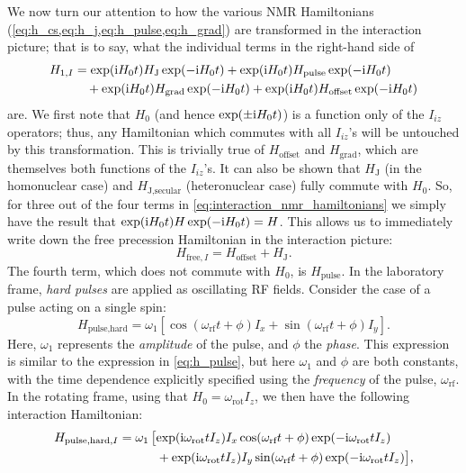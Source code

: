 We now turn our attention to how the various NMR Hamiltonians (\cref{eq:h_cs,eq:h_j,eq:h_pulse,eq:h_grad}) are transformed in the interaction picture; that is to say, what the individual terms in the right-hand side of
\begin{equation}
    \label{eq:interaction_nmr_hamiltonians}
    \begin{aligned}
        H_{1,I} &= \exp(\mathrm{i} H_0 t) H_\text{J} \exp(-\mathrm{i} H_0 t) + \exp(\mathrm{i} H_0 t) H_\text{pulse} \exp(-\mathrm{i} H_0 t) \\
                &\quad + \exp(\mathrm{i} H_0 t) H_\text{grad} \exp(-\mathrm{i} H_0 t) + \exp(\mathrm{i} H_0 t) H_\text{offset} \exp(-\mathrm{i} H_0 t)
    \end{aligned}
\end{equation}
are.
We first note that $H_0$ (and hence $\exp(\pm \mathrm{i} H_0t)$) is a function only of the $I_{iz}$ operators; thus, any Hamiltonian which commutes with all $I_{iz}$'s will be untouched by this transformation.
This is trivially true of $H_\text{offset}$ and $H_\text{grad}$, which are themselves both functions of the $I_{iz}$'s.
It can also be shown that $H_\text{J}$ (in the homonuclear case) and $H_\text{J,secular}$ (heteronuclear case) fully commute with $H_0$.
So, for three out of the four terms in \cref{eq:interaction_nmr_hamiltonians} we simply have the result that $\exp(\mathrm{i} H_0t)H\exp(-\mathrm{i} H_0t) = H$.
This allows us to immediately write down the free precession Hamiltonian in the interaction picture:
\begin{equation}
    \label{eq:h_free_interaction}
    H_{\text{free},I} = H_\text{offset} + H_\text{J}.
\end{equation}
The fourth term, which does not commute with $H_0$, is $H_\text{pulse}$.
In the laboratory frame, \textit{hard pulses} are applied as oscillating RF fields.
Consider the case of a pulse acting on a single spin:
\begin{equation}
    \label{eq:hard_pulse}
    H_\text{pulse,hard} = \omega_1 [\cos(\omega_\text{rf}t + \phi) I_x + \sin(\omega_\text{rf}t + \phi) I_y].
\end{equation}
Here, $\omega_1$ represents the \textit{amplitude} of the pulse, and $\phi$ the \textit{phase}. This expression is similar to the expression in \cref{eq:h_pulse}, but here $\omega_1$ and $\phi$ are both constants, with the time dependence explicitly specified using the \textit{frequency} of the pulse, $\omega_\text{rf}$.
In the rotating frame, using that $H_0 = \omega_\text{rot}I_z$, we then have the following interaction Hamiltonian:
\begin{equation}
    \label{eq:hard_pulse_rotatingframe_intermediate}
    \begin{aligned}
        H_{\text{pulse,hard,}I} &= \omega_1 \,\big[\! \exp(\mathrm{i} \omega_\text{rot}t I_z) I_x \cos(\omega_\text{rf}t + \phi) \exp(-\mathrm{i} \omega_\text{rot}t I_z) \\
                                &\quad\quad\quad + \exp(\mathrm{i} \omega_\text{rot}t I_z) I_y \sin(\omega_\text{rf}t + \phi) \exp(-\mathrm{i} \omega_\text{rot}t I_z) \big],
    \end{aligned}
\end{equation}
